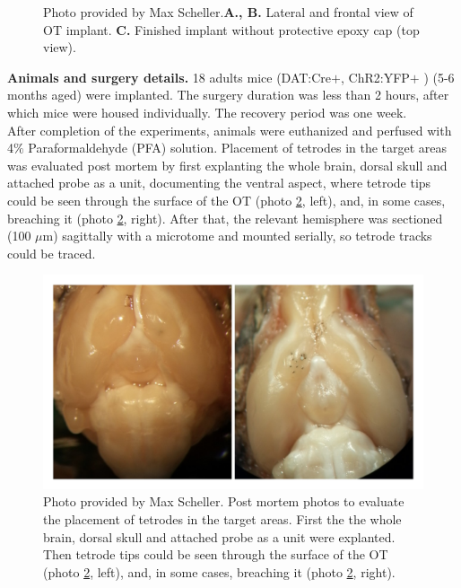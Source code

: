 \begin{framed}
\begin{figure}[H]
    \caption{Photo provided by Max Scheller.\textbf{A., B.} Lateral and frontal view of OT implant. \textbf{C.} Finished implant without protective epoxy cap (top view).}
    \label{fig:implant}
\end{figure}
\textbf{Animals and surgery details.}
18 adults mice (DAT:Cre$+$, ChR2:YFP$+$ ) (5-6 months aged) were implanted. The surgery duration was less than 2 hours, after which mice were housed individually. The recovery period was one week.\\ After completion of the experiments, animals were euthanized and perfused with 4$\%$ Paraformaldehyde (PFA) solution. Placement of tetrodes in the target areas was evaluated post mortem by first explanting the whole brain, dorsal skull and attached probe as a unit, documenting the ventral aspect, where tetrode tips could be seen through the surface of the OT (photo \ref{fig:surgery}, left), and, in some cases, breaching it (photo \ref{fig:surgery}, right). After that, the relevant hemisphere was sectioned (100 $\mu$m) sagittally with a microtome and mounted serially, so tetrode tracks could be traced.\\
\begin{figure}[H]
    \centering
    \includegraphics[scale=0.2]{figures/surgery_3.jpg}
    \caption{Photo provided by Max Scheller. Post mortem photos to evaluate the placement of tetrodes in the target areas. First the the whole brain, dorsal skull and attached probe as a unit were explanted. Then tetrode tips could be seen through the surface of the OT (photo \ref{fig:surgery}, left), and, in some cases, breaching it (photo \ref{fig:surgery}, right).}
    \label{fig:surgery}
\end{figure}

\end{framed}
